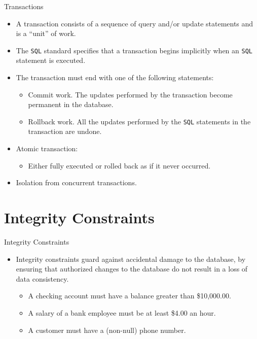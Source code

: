 \documentclass[aspectratio=169]{beamer}
\begin{document}
\begin{frame}{Transactions}
    \begin{itemize}
        \item A transaction consists of a sequence of query and/or update statements and is a ``unit'' of work.
        \item The \texttt{SQL} standard specifies that a transaction begins implicitly when an \texttt{SQL} statement is executed.
        \item The transaction must end with one of the following statements:
        \begin{itemize}
            \item Commit work. The updates performed by the transaction become permanent in the database.
            \item Rollback work. All the updates performed by the \texttt{SQL} statements in the transaction are undone.
        \end{itemize}
        \item Atomic transaction:
        \begin{itemize}
            \item Either fully executed or rolled back as if it never occurred.
        \end{itemize}
        \item Isolation from concurrent transactions.
    \end{itemize}
\end{frame}

\section{Integrity Constraints}

\begin{frame}{Integrity Constraints}
    \begin{itemize}
        \item Integrity constraints guard against accidental damage to the database, by ensuring that authorized changes to the database do not result in a loss of data consistency.
        \begin{itemize}
            \item A checking account must have a balance greater than \$10,000.00.
            \item A salary of a bank employee must be at least \$4.00 an hour.
            \item A customer must have a (non-null) phone number.
        \end{itemize}
    \end{itemize}
\end{frame}
\end{document}
